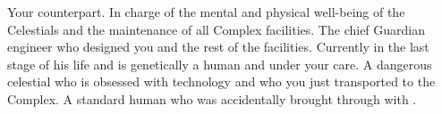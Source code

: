 \documentclass[char]{guardians}
\begin{document}
\begin{contacts}
  \contact{\cCaretaker{}} Your counterpart. In charge of the mental and physical well-being of the Celestials and the maintenance of all Complex facilities.
  \contact{\cJascha{}} The chief Guardian engineer who designed you and the rest of the facilities. Currently in the last stage of his life and is genetically a human and under your care.
  \contact{\cUnity{}} A dangerous celestial who is obsessed with technology and who you just transported to the Complex.
  \contact{\cKachiko{}} A standard human who was accidentally brought through with \cUnity{}.
\end{contacts}
\end{document}
